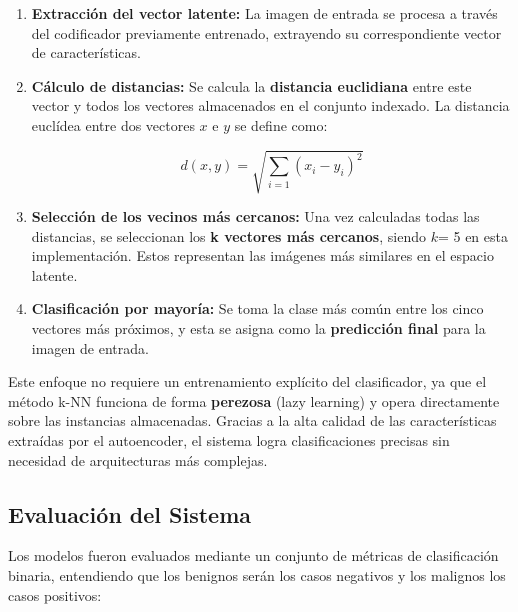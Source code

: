 \documentclass[12pt]{article} %
\begin{document}
\begin{enumerate}
    \item \textbf{Extracción del vector latente:} La imagen de entrada se procesa a través del codificador previamente entrenado, extrayendo su correspondiente vector de características.
    
    \item \textbf{Cálculo de distancias:} Se calcula la \textbf{distancia euclidiana} entre este vector y todos los vectores almacenados en el conjunto indexado. La distancia euclídea entre dos vectores \( x \) e \( y \) se define como:
    
    \begin{equation}
        d(x, y) = \sqrt{ \sum_{i=1} (x_i - y_i)^2 }
    \end{equation}

    \item \textbf{Selección de los vecinos más cercanos:} Una vez calculadas todas las distancias, se seleccionan los \textbf{k vectores más cercanos}, siendo \(k \)= 5 en esta implementación. Estos representan las imágenes más similares en el espacio latente.
    \item \textbf{Clasificación por mayoría:} Se toma la clase más común entre los cinco vectores más próximos, y esta se asigna como la \textbf{predicción final} para la imagen de entrada.

\end{enumerate}

Este enfoque no requiere un entrenamiento explícito del clasificador, ya que el método k-NN funciona de forma \textbf{perezosa} (lazy learning) y opera directamente sobre las instancias almacenadas. Gracias a la alta calidad de las características extraídas por el autoencoder, el sistema logra clasificaciones precisas sin necesidad de arquitecturas más complejas.

\subsection{Evaluación del Sistema}
Los modelos fueron evaluados mediante un conjunto de métricas de clasificación binaria, entendiendo que los benignos serán los casos negativos y los malignos los casos positivos:
\end{document}
